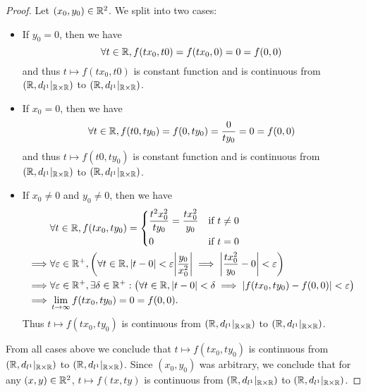 \begin{proof}
  Let \((x_0, y_0) \in \mathbb{R}^2\).
  We split into two cases:
  \begin{itemize}
    \item If \(y_0 = 0\), then we have
          \[
            \forall t \in \mathbb{R}, f(t x_0, t0) = f(t x_0, 0) = 0 = f(0, 0)
          \]
          and thus \(t \mapsto f(t x_0, t0)\) is constant function and is continuous from \((\mathbb{R}, d_{l^1}|_{\mathbb{R} \times \mathbb{R}})\) to \((\mathbb{R}, d_{l^1}|_{\mathbb{R} \times \mathbb{R}})\).
    \item If \(x_0 = 0\), then we have
          \[
            \forall t \in \mathbb{R}, f(t0, t y_0) = f(0, t y_0) = \dfrac{0}{t y_0} = 0 = f(0, 0)
          \]
          and thus \(t \mapsto f(t0, t y_0)\) is constant function and is continuous from \((\mathbb{R}, d_{l^1}|_{\mathbb{R} \times \mathbb{R}})\) to \((\mathbb{R}, d_{l^1}|_{\mathbb{R} \times \mathbb{R}})\).
    \item If \(x_0 \neq 0\) and \(y_0 \neq 0\), then we have
          \begin{align*}
                     & \forall t \in \R, f(t x_0, t y_0) = \begin{dcases}
                                                             \dfrac{t^2 x_0^2}{t y_0} = \dfrac{t x_0^2}{y_0} & \text{if } t \neq 0 \\
                                                             0                                               & \text{if } t = 0
                                                           \end{dcases}                                                            \\
            \implies & \forall \varepsilon \in \R^+, \bigg(\forall t \in \R, \abs{t - 0} < \varepsilon \abs{\dfrac{y_0}{x_0^2}} \implies \abs{\dfrac{t x_0^2}{y_0} - 0} < \varepsilon\bigg) \\
            \implies & \forall \varepsilon \in \R^+, \exists \delta \in \R^+ : \big(\forall t \in \R, \abs{t - 0} < \delta \implies \abs{f(t x_0, t y_0) - f(0, 0)} < \varepsilon\big)      \\
            \implies & \lim_{t \to \infty} f(t x_0, t y_0) = 0 = f(0, 0).
          \end{align*}
          Thus \(t \mapsto f(t x_0, t y_0)\) is continuous from \((\mathbb{R}, d_{l^1}|_{\mathbb{R} \times \mathbb{R}})\) to \((\mathbb{R}, d_{l^1}|_{\mathbb{R} \times \mathbb{R}})\).
  \end{itemize}
  From all cases above we conclude that \(t \mapsto f(t x_0, t y_0)\) is  continuous from \((\mathbb{R}, d_{l^1}|_{\mathbb{R} \times \mathbb{R}})\) to \((\mathbb{R}, d_{l^1}|_{\mathbb{R} \times \mathbb{R}})\).
  Since \((x_0, y_0)\) was arbitrary, we conclude that for any \((x, y) \in \mathbb{R}^2\), \(t \mapsto f(tx, ty)\) is continuous from \((\mathbb{R}, d_{l^1}|_{\mathbb{R} \times \mathbb{R}})\) to \((\mathbb{R}, d_{l^1}|_{\mathbb{R} \times \mathbb{R}})\).


\end{proof}

